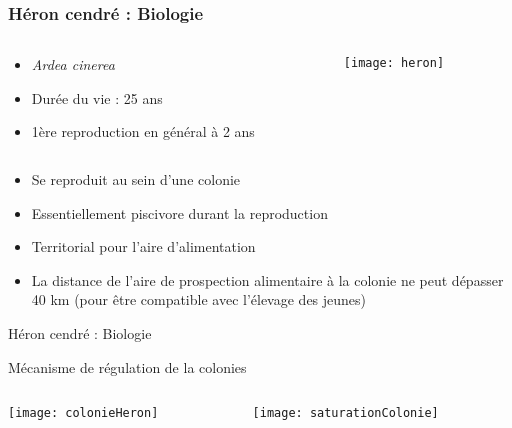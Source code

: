 \documentclass[]{beamer}
\begin{document}
\begin{frame}
  \frametitle{Héron cendré : Biologie}
  \begin{columns}
    \begin{column}[c]{0.5\textwidth}
      \begin{itemize}
      \item \textit{Ardea cinerea} 
      \item Durée du vie : 25 ans 
      \item 1ère reproduction en général à 2 ans
      \end{itemize}

    \end{column}
    \begin{column}[l]{0.5\textwidth}
      \begin{center}
        \texttt{[image: heron]} 
      \end{center}
    \end{column}
  \end{columns}
  
  
  
  \begin{itemize}

  \item Se reproduit au sein d’une colonie
  \item Essentiellement piscivore durant la reproduction
  \item Territorial pour l'aire d'alimentation
  \item La distance de l’aire de prospection alimentaire à la colonie ne peut dépasser 40 km (pour être compatible avec l’élevage des jeunes)
  \end{itemize}
\end{frame}

% 
\begin{frame}{Héron cendré : Biologie}
  \begin{center}
    Mécanisme de régulation de la colonies
  \end{center}
  \begin{columns}
    \begin{column}[c]{0.4\textwidth}
      \texttt{[image: colonieHeron]}    
    \end{column}
    \begin{column}[c]{0.6\textwidth}
      \texttt{[image: saturationColonie]}    
    \end{column}
  \end{columns}
\end{frame}
\end{document}
